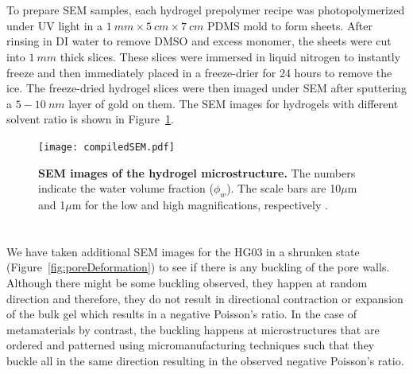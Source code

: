 \section{}
To prepare SEM samples, each hydrogel prepolymer recipe was photopolymerized under UV light in a $1~mm\times5~cm\times7~cm$ PDMS mold to form sheets. After rinsing in DI water to remove DMSO and excess monomer, the sheets were cut into $1~mm$ thick slices. These slices were immersed in liquid nitrogen to instantly freeze and then immediately placed in a freeze-drier for 24 hours to remove the ice. The freeze-dried hydrogel slices were then imaged under SEM after sputtering a $5-10~nm$ layer of gold on them. The SEM images for hydrogels with different solvent ratio is shown in Figure~\ref{fig:compiledSEM}.

\begin{figure}[!th]
      \centering
      \texttt{[image: compiledSEM.pdf]}
      \caption[]{\textbf{SEM images of the hydrogel microstructure.} The numbers indicate the water volume fraction ($\phi_w$). The scale bars are 10$\mu$m and 1$\mu$m for the low and high magnifications, respectively \cite{Khodambashi2021}.}
      \label{fig:compiledSEM}
\end{figure}

\section{}
We have taken additional SEM images for the HG03 in a shrunken state (Figure~\ref{fig:poreDeformation}) to see if there is any buckling of the pore walls. Although there might be some buckling observed, they happen at random direction and therefore, they do not result in directional contraction or expansion of the bulk gel which results in a negative Poisson’s ratio. In the case of metamaterials by contrast, the buckling happens at microstructures that are ordered and patterned using micromanufacturing techniques such that they buckle all in the same direction resulting in the observed negative Poisson’s ratio.

